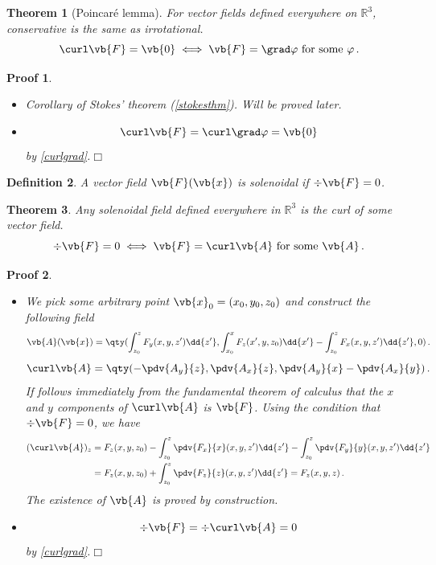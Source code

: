 \documentclass{article}
\theoremstyle{plain}\theoremheaderfont{\normalfont\itshape}\theorembodyfont{\rmfamily}\theoremseparator{.}\newtheorem*{rem}{Remark}\newtheorem*{ex}{Example}\newtheorem*{proof}{Proof}\newtheorem*{altp}{Alternative proof}
\theoremstyle{plain}\theoremheaderfont{\normalfont\bfseries}\theorembodyfont{\rmfamily}\theoremseparator{.}\newtheorem{thm}{Theorem}[section]\newtheorem{lem}[thm]{Lemma}\newtheorem{prop}[thm]{Proposition}\newtheorem*{cor}{Corollary}\newtheorem{defn}[thm]{Definition}\newtheorem{clm}[thm]{Claim}\newtheorem{clminproof}{Claim}
\theoremstyle{break}\theoremheaderfont{\normalfont\itshape}\theorembodyfont{\rmfamily}\theoremseparator{.\medskip}\newtheorem*{proofskip}{Proof}\newtheorem*{exs}{Examples}\newtheorem*{rems}{Remarks}
\theoremstyle{break}\theoremheaderfont{\normalfont\bfseries}\theorembodyfont{\rmfamily}\theoremseparator{.\medskip}\newtheorem{lemskip}[thm]{Lemma}\newtheorem{defnskip}[thm]{Definition}\newtheorem{propskip}[thm]{Proposition}\newtheorem{thmskip}[thm]{Theorem}
\numberwithin{equation}{section}
\newcommand{\qed}{\hfill\ensuremath{\Box}}
\begin{document}
	\begin{thm}[Poincar\'{e} lemma]\label{poincare}
		For vector fields defined everywhere on \(\mathbb{R}^3\), conservative is the same as irrotational.
		\[\curl\vb{F}=\vb{0}\iff\vb{F}=\grad\varphi\text{ for some }\varphi\,.\]
	\end{thm}
	\begin{proofskip}
		\begin{itemize}
			\item[(\(\Rightarrow\))] Corollary of Stokes' theorem (\cref{stokesthm}). Will be proved later.
			\item[(\(\Leftarrow\))]
			\[\curl\vb{F}=\curl\grad\varphi=\vb{0}\]
			by \cref{curlgrad}.\qed
		\end{itemize}
	\end{proofskip}

	\begin{defn}
		A vector field \(\vb{F}(\vb{x})\) is \textit{solenoidal} if \(\div{\vb{F}}=0\).
	\end{defn}
	\begin{thm}
		Any solenoidal field defined everywhere in \(\mathbb{R}^3\) is the curl of some vector field.
		\[\div\vb{F}=0\iff\vb{F}=\curl\vb{A}\text{ for some }\vb{A}\,.\]
	\end{thm}
	\begin{proofskip}
		\begin{itemize}
			\item[(\(\Rightarrow\))] We pick some arbitrary point \(\vb{x}_0=(x_0,y_0,z_0)\) and construct the following field
			\[\vb{A}(\vb{x})=\qty(\int_{z_0}^{z}F_y(x,y,z')\dd{z'},\int_{x_0}^{x}F_z(x',y,z_0)\dd{x'}-\int_{z_0}^{z}F_x(x,y,z')\dd{z'},0)\,.\]
			\[\curl\vb{A}=\qty(-\pdv{A_y}{z},\pdv{A_x}{z},\pdv{A_y}{x}-\pdv{A_x}{y})\,.\]
			If follows immediately from the fundamental theorem of calculus that the \(x\) and \(y\) components of \(\curl\vb{A}\) is \(\vb{F}\). Using the condition that \(\div\vb{F}=0\), we have
			\begin{align*}
				(\curl\vb{A})_z&=F_z(x,y,z_0)-\int_{z_0}^{z}\pdv{F_x}{x}(x,y,z')\dd{z'}-\int_{z_0}^{z}\pdv{F_y}{y}(x,y,z')\dd{z'}\\
				&=F_z(x,y,z_0)+\int_{z_0}^{z}\pdv{F_z}{z}(x,y,z')\dd{z'}=F_z(x,y,z)\,.
			\end{align*}
			The existence of \(\vb{A}\) is proved by construction.
			\item[(\(\Leftarrow\))]
			\[\div\vb{F}=\div\curl\vb{A}=0\]
			by \cref{curlgrad}.\qed
		\end{itemize}
	\end{proofskip}
\end{document}
